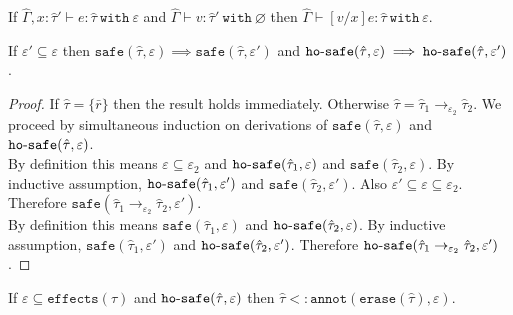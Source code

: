 \documentclass{llncs}
\newcommand{\keywadj}[1]{\mathtt{#1}}
\newcommand{\keyw}[1]{\keywadj{#1}~}
\newcommand{\kw}[1]{\keyw{ #1 }}
\newcommand{\kwa}[1]{\keywadj{ #1 }}
\newcommand{\hyphen}{\hbox{-}}
\begin{document}
\hrulefill

\begin{lemma}[Substitution]
If $\hat \Gamma, x: \hat \tau' \vdash e: \hat \tau~\kw{with} \varepsilon$ and $\hat \Gamma \vdash v: \hat \tau'~\kw{with} \varnothing$ then $\hat \Gamma \vdash [v/x]e: \hat \tau~\kw{with} \varepsilon$.
\end{lemma}

\hrulefill

\begin{lemma}
If $\varepsilon' \subseteq \varepsilon$ then $\kwa{safe}(\hat \tau, \varepsilon) \implies \kwa{safe}(\hat \tau, \varepsilon')$ and $\kwa{ho \hyphen safe}(\hat \tau, \varepsilon) \implies \kwa{ho \hyphen safe}(\hat \tau, \varepsilon')$.
\end{lemma}

\begin{proof}
If $\hat \tau = \{ \bar r \}$ then the result holds immediately. Otherwise $\hat \tau = \hat \tau_1 \rightarrow_{\varepsilon_2} \hat \tau_2$. We proceed by simultaneous induction on derivations of $\kwa{safe}(\hat \tau, \varepsilon)$ and $\kwa{ho \hyphen safe}(\hat \tau, \varepsilon)$.\\

\noindent
\fbox{$\kwa{safe}(\hat \tau_1 \rightarrow_{\varepsilon_2} \hat \tau_2, \varepsilon)$} By definition this means $\varepsilon \subseteq \varepsilon_2$ and $\kwa{ho \hyphen safe}(\hat \tau_1, \varepsilon)$ and $\kwa{safe}(\hat \tau_2, \varepsilon)$. By inductive assumption, $\kwa{ho \hyphen safe}(\hat \tau_1, \varepsilon')$ and $\kwa{safe}(\hat \tau_2, \varepsilon')$. Also $\varepsilon' \subseteq \varepsilon \subseteq \varepsilon_2$. Therefore $\kwa{safe}(\hat \tau_1 \rightarrow_{\varepsilon_2} \hat \tau_2, \varepsilon')$. \\

\noindent
\fbox{$\kwa{ho \hyphen safe}(\hat \tau_1 \rightarrow_{\varepsilon_2} \hat \tau_2, \varepsilon)$} By definition this means $\kwa{safe}(\hat \tau_1, \varepsilon)$ and $\kwa{ho \hyphen safe}(\hat \tau_2, \varepsilon)$. By inductive assumption, $\kwa{safe}(\hat \tau_1, \varepsilon')$ and $\kwa{ho \hyphen safe}(\hat \tau_2, \varepsilon')$. Therefore $\kwa{ho \hyphen safe}(\hat \tau_1 \rightarrow_{\varepsilon_2} \hat \tau_2, \varepsilon')$.

\end{proof}

\hrulefill

\begin{lemma}
If $\varepsilon \subseteq \kwa{effects}(\hat \tau)$ and $\kwa{ho \hyphen safe}(\hat \tau, \varepsilon)$ then $\hat \tau <: \kwa{annot}(\kwa{erase}(\hat \tau), \varepsilon)$.
\end{lemma}
\end{document}
